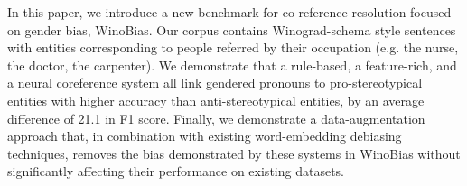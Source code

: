 In this paper, we introduce a new benchmark for co-reference resolution focused on gender bias, WinoBias. Our corpus contains Winograd-schema style sentences with entities corresponding to people referred by their occupation (e.g. the nurse, the doctor, the carpenter). We demonstrate that a rule-based, a feature-rich, and a neural coreference system all link gendered pronouns to pro-stereotypical entities with higher accuracy than anti-stereotypical entities, by an average difference of 21.1 in F1 score. Finally, we demonstrate a data-augmentation approach that, in combination with existing word-embedding debiasing techniques, removes the bias demonstrated by these systems in WinoBias without significantly affecting their performance on existing datasets.

